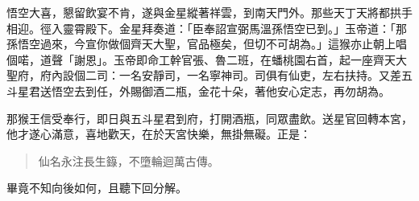 悟空大喜，懇留飲宴不肯，遂與金星縱著祥雲，到南天門外。那些天丁天將都拱手相迎。徑入靈霄殿下。金星拜奏道：「臣奉詔宣弼馬溫孫悟空已到。」玉帝道：「那孫悟空過來，今宣你做個齊天大聖，官品極矣，但切不可胡為。」這猴亦止朝上唱個喏，道聲「謝恩」。玉帝即命工幹官張、魯二班，在蟠桃園右首，起一座齊天大聖府，府內設個二司：一名安靜司，一名寧神司。司俱有仙吏，左右扶持。又差五斗星君送悟空去到任，外賜御酒二瓶，金花十朵，著他安心定志，再勿胡為。

那猴王信受奉行，即日與五斗星君到府，打開酒瓶，同眾盡飲。送星官回轉本宮，他才遂心滿意，喜地歡天，在於天宮快樂，無掛無礙。正是：
\begin{quote}
仙名永注長生籙，不墮輪迴萬古傳。
\end{quote}

畢竟不知向後如何，且聽下回分解。
